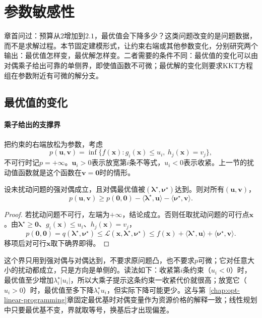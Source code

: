 \section{参数敏感性}
\label{sec:opt-con-sensitivity}

章首问过：预算从$2$增加到$2.1$，最优值会下降多少？这类问题改变的是问题数据，而不是求解过程。本节固定建模形式，让约束右端或其他参数变化，分别研究两个输出：最优值怎样变，最优解怎样变。二者需要的条件不同：最优值的变化可以由对偶乘子给出可靠的单侧界，即使值函数不可微；最优解的变化则要求KKT方程组在参数附近有可微的解分支。

\subsection{最优值的变化}
\label{sec:opt-con-value-sensitivity}

\paragraph{乘子给出的支撑界}
把约束的右端放松为参数，考虑
\begin{equation}
\label{eq:opt-con-perturbed}
  p(\bm u,\bm v)=\inf\{f(\bm x):g_i(\bm x)\leq u_i,\ h_j(\bm x)=v_j\},
\end{equation}
不可行时记$p=+\infty$。$\bm u_i>0$表示放宽第$i$条不等式，$u_i<0$表示收紧。上一节的扰动值函数就是这个函数在$\bm v=\bm0$时的情形。

\begin{theorem}[最优值的全局支撑界]
\label{thm:opt-con-global-sensitivity}
设未扰动问题的强对偶成立，且对偶最优值被$(\bm\lambda^\star,\bm\nu^\star)$达到。则对所有$(\bm u,\bm v)$，
\begin{equation}
\label{eq:opt-con-sensitivity-bound}
  p(\bm u,\bm v)\geq p(\bm0,\bm0)-\langle\bm\lambda^\star,\bm u\rangle-\langle\bm\nu^\star,\bm v\rangle.
\end{equation}
\end{theorem}

\begin{proof}
若扰动问题不可行，左端为$+\infty$，结论成立。否则任取扰动问题的可行点$\bm x$。由$\bm\lambda^\star\geq\bm0$、$g_i(\bm x)\leq u_i$、$h_j(\bm x)=v_j$，
\[
  p(\bm0,\bm0)=q(\bm\lambda^\star,\bm\nu^\star)\leq\mathcal L(\bm x,\bm\lambda^\star,\bm\nu^\star)\leq f(\bm x)+\langle\bm\lambda^\star,\bm u\rangle+\langle\bm\nu^\star,\bm v\rangle.
\]
移项后对可行$\bm x$取下确界即得。
\end{proof}

这个界只用到强对偶与对偶达到，不要求原问题凸，也不要求$p$可微；它对任意大小的扰动都成立，只是方向是单侧的。读法如下：收紧第$i$条约束（$u_i<0$）时，最优值至少增加$\lambda_i^\star|u_i|$，所以大乘子提示这条约束一收紧代价就很高；放宽它（$u_i>0$）时，最优值至多下降$\lambda_i^\star u_i$，但实际下降可能更少。这与第~\ref{chap:opt-linear-programming}章固定最优基时对偶变量作为资源价格的解释一致；线性规划中只要最优基不变，界就取等号，换基后才出现偏差。

